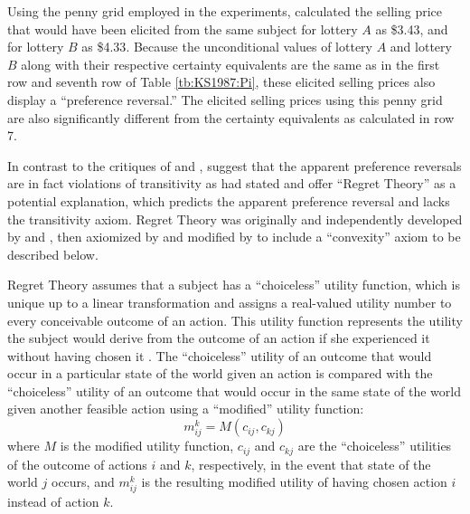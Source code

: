\documentclass[../main.tex]{subfiles}
\begin{document}
Using the penny grid employed in the \textcite{Grether1979} experiments, \textcite[680]{Karni1987} calculated the selling price that would have been elicited from the same subject for lottery $A$ as \${3.43}, and for lottery $B$ as \${4.33}.
Because the unconditional values of lottery $A$ and lottery $B$ along with their respective certainty equivalents are the same as in the first row and seventh row of Table \ref{tb:KS1987:Pi}, these elicited selling prices also display a \enquote{preference reversal.}
The elicited selling prices using this penny grid are also significantly different from the certainty equivalents as calculated in row 7.

In contrast to the critiques of \textcite{Holt1986} and \textcite{Karni1987}, \textcite{Loomes1989} suggest that the apparent preference reversals are in fact violations of transitivity as \textcite[623]{Grether1979} had stated and offer \enquote{Regret Theory} as a potential explanation, which predicts the apparent preference reversal and lacks the transitivity axiom.
Regret Theory was originally and independently developed by \textcite{Loomes1982} and \textcite{Bell1982}, then axiomized by \textcite{Fishburn1987} and modified by \textcite{Loomes1987} to include a \enquote{convexity} axiom to be described below.

Regret Theory assumes that a subject has a \enquote{choiceless} utility function, which is unique up to a linear transformation and assigns a real-valued utility number to every conceivable outcome of an action.
This utility function represents the utility the subject would derive from the outcome of an action if she experienced it without having chosen it \parencite[807]{Loomes1987}.
The \enquote{choiceless} utility of an outcome that would occur in a particular state of the world given an action is compared with the \enquote{choiceless} utility of an outcome that would occur in the same state of the world given another feasible action using a \enquote{modified} utility function:
\begin{equation}
	\label{eq:LS1987:mu}
	m^k_{ij} = M( c_{ij} , c_{kj} )
\end{equation}
\noindent where $M$ is the modified utility function, $c_{ij}$ and $c_{kj}$ are the \enquote{choiceless} utilities of the outcome of actions $i$ and $k$, respectively, in the event that state of the world $j$ occurs, and $m^k_{ij}$ is the resulting modified utility of having chosen action $i$ instead of action $k$.
\end{document}
